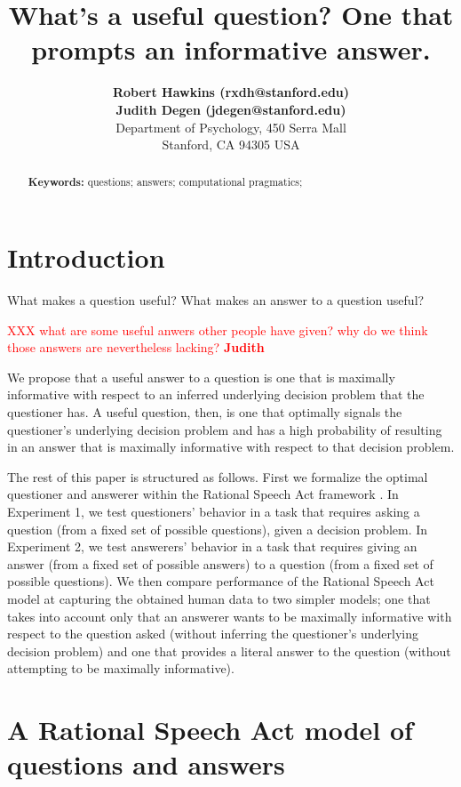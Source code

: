 \documentclass[10pt,letterpaper]{article}
\title{What's a useful question? One that prompts an informative answer.}
\author{{\large \bf Robert Hawkins (rxdh@stanford.edu)} \AND {\large \bf Andreas Stuhlm\"uller (andreas@stuhlmueller.org)}\\ 
	\AND
	{\large \bf Judith Degen (jdegen@stanford.edu)} 
  \AND {\large \bf Noah D.~Goodman (ngoodman@stanford.edu)} \\
  Department of Psychology, 450 Serra Mall \\
  Stanford, CA 94305 USA}
\newcommand{\red}[1]{\textcolor{Red}{#1}}
\begin{document}
\maketitle


\begin{abstract}


\textbf{Keywords:} 
questions; answers; computational pragmatics; 
\end{abstract}

\section{Introduction}
\label{sec:intro}

What makes a question useful? What makes an answer to a question useful? 

\red{XXX what are some useful anwers other people have given? why do we think those answers are nevertheless lacking? \textbf{Judith}}

We propose that a useful answer to a question is one that is maximally informative with respect to an inferred underlying decision problem that the questioner has. A useful question, then, is one that optimally signals the questioner's underlying decision problem and has a high probability of resulting in an answer that is maximally informative with respect to that decision problem. 

The rest of this paper is structured as follows. First we formalize the optimal questioner and answerer within the Rational Speech Act framework \cite{frank2012}. In Experiment 1, we test questioners' behavior in a task that requires asking a question (from a fixed set of possible questions), given a decision problem. In Experiment 2, we test answerers' behavior in a task that requires giving an answer (from a fixed set of possible answers) to a question (from a fixed set of possible questions). We then compare performance of the Rational Speech Act model at capturing the obtained human data to two simpler models; one that takes into account only that an answerer wants to be maximally informative with respect to the question asked (without inferring the questioner's underlying decision problem) and one that provides a literal answer to the question (without attempting to be maximally informative).


\section{A Rational Speech Act model of questions and answers}
\label{sec:model}
\end{document}

